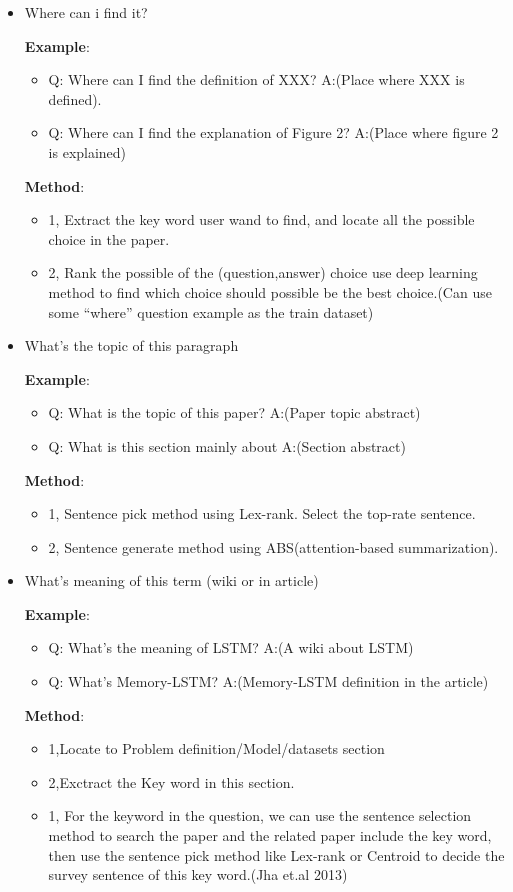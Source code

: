 \begin{itemize}
\begin{itemize}
\item Where can i find it? 

  \textbf{Example}:
  \begin{itemize}
  \item Q: Where can I find the definition of XXX? A:(Place where XXX is defined).
  \item Q: Where can I find the explanation of Figure 2? A:(Place where figure 2 is explained)
  \end{itemize}

  \textbf{Method}:
  \begin{itemize}
  \item1, Extract the key word user wand to find, and locate all the possible choice in the
paper.
\item2, Rank the possible of the (question,answer) choice use deep learning method to
find which choice should possible be the best choice.(Can use some ``where'' question
example as the train dataset)


  \end{itemize}


\item What's the topic of this paragraph

  \textbf{Example}:
  \begin{itemize}
  \item Q: What is the topic of this paper? A:(Paper topic abstract)
  \item Q: What is this section mainly about A:(Section abstract)

  \end{itemize}

  \textbf{Method}:
    \begin{itemize}
  \item1, Sentence pick method using Lex-rank. Select the top-rate sentence.
  \item2, Sentence generate method using ABS(attention-based summarization).
  \end{itemize}
\item What's meaning of this term (wiki or in article) 

  \textbf{Example}:
  \begin{itemize}
  \item Q: What's the meaning of LSTM? A:(A wiki about LSTM)
  \item Q: What's Memory-LSTM? A:(Memory-LSTM definition in the article)
  \end{itemize}

  \textbf{Method}:
	\begin{itemize}
    \item1,Locate to Problem definition/Model/datasets section
    \item2,Exctract the Key word in this section.
    \end{itemize}
  \begin{itemize}
  \item1, For the keyword in the question, we can use the sentence selection method to search the paper and the related paper include the key word, then use the sentence pick method like Lex-rank or Centroid to decide the survey sentence of this key word.(Jha et.al 2013)
  

\end{itemize}
\end{itemize}
\end{itemize}

